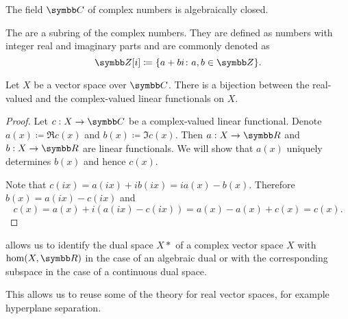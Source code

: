\begin{theorem}\label{thm:fundamental_theorem_of_algebra}
  The field \( \C \) of complex numbers is algebraically closed.
\end{theorem}

\begin{definition}\label{def:gaussian_integers}
  The  are a subring of the complex numbers. They are defined as numbers with integer real and imaginary parts and are commonly denoted as
  \begin{equation*}
    \Z[i] \coloneqq \{ a + bi \colon a, b \in \Z \}.
  \end{equation*}
\end{definition}

\begin{theorem}\label{thm:linear_functionals_over_c}
  Let \( X \) be a vector space over \( \C \). There is a bijection between the real-valued and the complex-valued linear functionals on \( X \).
\end{theorem}
\begin{proof}
  Let \( c: X \to \C \) be a complex-valued linear functional. Denote \( a(x) \coloneqq \Re c(x) \) and \( b(x) \coloneqq \Im c(x) \). Then \( a: X \to \R \) and \( b: X \to \R \) are linear functionals. We will show that \( a(x) \) uniquely determines \( b(x) \) and hence \( c(x) \).

  Note that \( c(ix) = a(ix) + i b(ix) = i a(x) - b(x) \). Therefore \( b(x) = a(ix) - c(ix) \) and
  \begin{equation*}
    c(x) = a(x) + i (a(ix) - c(ix)) = a(x) - a(x) + c(x) = c(x).
  \end{equation*}
\end{proof}

\begin{remark}\label{remark:linear_functionals_over_c}
   allows us to identify the dual space \( X* \) of a complex vector space \( X \) with \( \Hom(X, \R) \) in the case of an algebraic dual or with the corresponding subspace in the case of a continuous dual space.

  This allows us to reuse some of the theory for real vector spaces, for example hyperplane separation.
\end{remark}
